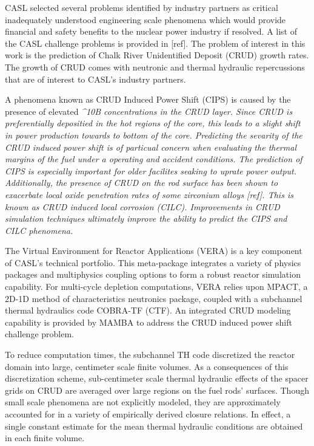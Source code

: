 CASL selected several problems identified by industry partners as critical
inadequately understood engineering scale phenomena which would provide financial and
safety benefits to the nuclear power industry if resolved.  A list of the CASL
challenge problems is provided in [ref].  The problem of interest in this
work is the prediction of Chalk River Unidentified Deposit (CRUD) growth rates.
The growth of CRUD comes with neutronic and thermal hydraulic repercussions that are of
interest to CASL's industry partners.  

A phenomena known as CRUD Induced Power Shift (CIPS) is caused by the presence of elevated \em{^{10}B} concentrations in the CRUD layer.  Since CRUD is preferentially depositied in the hot regions of the core, this leads to a slight shift in power production towards to bottom of the core.  Predicting the sevarity of the CRUD induced power shift is of particual concern when evaluating the
thermal margins of the fuel under a operating and accident conditions.  The prediction of CIPS is especially important for older facilites seaking to uprate power output.
Additionally, the presence of CRUD on the rod
surface has been shown to exacerbate local oxide penetration rates of some zirconium alloys [ref].
This is known as CRUD induced local corrosion (CILC).  Improvements in CRUD simulation techniques ultimately improve the ability to predict the CIPS and CILC phenomena.

The Virtual Environment for Reactor Applications (VERA) is a key component of
CASL's technical portfolio.  This meta-package integrates a variety of physics
packages and multiphysics coupling options to form a robust reactor simulation
capability.  For multi-cycle depletion computations, VERA relies upon MPACT, a
2D-1D method of characteristics neutronics package, coupled with a subchannel
thermal hydraulics code COBRA-TF (CTF).  An integrated CRUD modeling capability
is provided by MAMBA to address the CRUD induced power shift challenge problem.

To reduce computation times, the subchannel TH code discretized the reactor
domain into large, centimeter scale finite volumes. As a consequences of this discretization scheme, sub-centimeter scale
thermal hydraulic effects of the spacer grids on CRUD are averaged over
large regions on the fuel rods' surfaces.  Though small scale phenomena are not
explicitly modeled, they are approximately accounted for in a variety of empirically derived
closure relations.  In effect, a single constant estimate for the mean thermal
hydraulic conditions are obtained in each finite volume.

